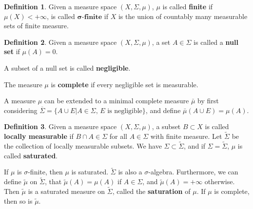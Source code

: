 \documentclass[openany]{book}
\theoremstyle{definition}
\newtheorem{definition}{Definition}[chapter]
\theoremstyle{remark}
\begin{document}
\begin{definition}
    Given a measure space $(X,\Sigma,\mu)$, $\mu$ is called \textbf{finite} if $\mu(X)<+\infty$, is called $\boldsymbol{\sigma}\textbf{-finite}$ if $X$ is the union of countably many measurable sets of finite measure.
\end{definition}
\begin{definition}
    Given a measure space $(X,\Sigma,\mu)$, a set $A\in\Sigma$ is called a \textbf{null set} if $\mu(A)=0$.

    A subset of a null set is called \textbf{negligible}.

    The measure $\mu$ is \textbf{complete} if every negligible set is measurable.
\end{definition}
A measure $\mu$ can be extended to a minimal complete measure $\bar{\mu}$ by first considering $\overline{\Sigma}=\{A\cup E|A\in\Sigma,\,E\textrm{ is negligible}\}$, and define $\bar{\mu}(A\cup E)=\mu(A)$.
\begin{definition}
    Given a measure space $(X,\Sigma,\mu)$, a subset $B\subset X$ is called \textbf{locally measurable} if $B\cap A\in\Sigma$ for all $A\in\Sigma$ with finite measure. Let $\widetilde{\Sigma}$ be the collection of locally measurable subsets. We have $\Sigma\subset\widetilde{\Sigma}$, and if $\Sigma=\widetilde{\Sigma}$, $\mu$ is called \textbf{saturated}.
\end{definition}
If $\mu$ is $\sigma$-finite, then $\mu$ is saturated. $\widetilde{\Sigma}$ is also a $\sigma$-algebra. Furthermore, we can define $\tilde{\mu}$ on $\widetilde{\Sigma}$, that $\tilde{\mu}(A)=\mu(A)$ if $A\in\Sigma$, and $\tilde{\mu}(A)=+\infty$ otherwise. Then $\tilde{\mu}$ is a saturated measure on $\widetilde{\Sigma}$, called the \textbf{saturation} of $\mu$. If $\mu$ is complete, then so is $\tilde{\mu}$.
\end{document}
